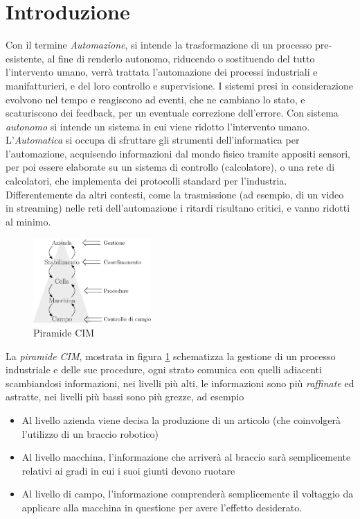 \documentclass[10pt, letterpaper]{report}
\begin{document}
\section{Introduzione}
Con il termine \textit{Automazione}, si intende la trasformazione 
di un processo pre-esistente, al fine di renderlo autonomo, riducendo o 
sostituendo del tutto l'intervento umano, verrà trattata l'automazione 
dei processi industriali e manifatturieri, e del loro controllo e 
supervisione. I sistemi presi in considerazione evolvono nel 
tempo e reagiscono ad eventi, che ne cambiano lo stato, e scaturiscono 
dei feedback, per un eventuale correzione dell'errore.\acc 
Con sistema \textit{autonomo} si intende un sistema in cui viene 
ridotto l'intervento umano. L'\textit{Automatica} si occupa di 
sfruttare gli strumenti dell'informatica per l'automazione, acquisendo informazioni 
dal mondo fisico tramite appositi sensori, per poi essere elaborate 
su un sistema di controllo (calcolatore), o una rete di calcolatori, 
che implementa dei protocolli standard per l'industria. Differentemente da 
altri contesti, come la trasmissione (ad esempio, di un video in streaming) nelle 
reti dell'automazione i ritardi risultano critici, e vanno ridotti al 
minimo.
\begin{center}
    \begin{figure}[h!]
        \centering
        \includegraphics[width=0.4\textwidth ]{images/CIM.eps}
        \caption{Piramide CIM}
        \label{fig:cim}
   \end{figure}
   \end{center}
La \textit{piramide CIM}, mostrata in figura \ref{fig:cim}
schematizza la gestione di un processo industriale e delle sue procedure, 
ogni strato comunica con quelli adiacenti scambiandosi informazioni, nei 
livelli più alti, le informazioni sono più \textit{raffinate} ed 
astratte, nei livelli più bassi sono più grezze, ad esempio\begin{itemize}
    \item Al livello azienda viene decisa la produzione di un articolo (che 
    coinvolgerà l'utilizzo di un braccio robotico)
    \item Al livello macchina, l'informazione che arriverà al braccio 
    sarà semplicemente relativi ai gradi in cui i suoi giunti devono 
    ruotare
    \item Al livello di campo, l'informazione comprenderà semplicemente 
    il voltaggio da applicare alla macchina in questione per avere l'effetto 
    desiderato.
\end{itemize}
\end{document}
